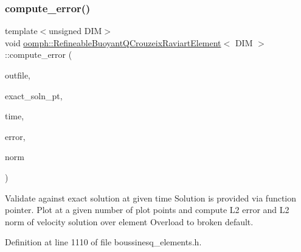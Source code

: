 \subsubsection{\texorpdfstring{compute\+\_\+error()}{compute\_error()}\hspace{0.1cm}{\footnotesize\ttfamily [1/2]}}
{\footnotesize\ttfamily template$<$unsigned D\+IM$>$ \\
void \hyperlink{classoomph_1_1RefineableBuoyantQCrouzeixRaviartElement}{oomph\+::\+Refineable\+Buoyant\+Q\+Crouzeix\+Raviart\+Element}$<$ D\+IM $>$\+::compute\+\_\+error (\begin{DoxyParamCaption}\item[{std\+::ostream \&}]{outfile,  }\item[{Finite\+Element\+::\+Unsteady\+Exact\+Solution\+Fct\+Pt}]{exact\+\_\+soln\+\_\+pt,  }\item[{const double \&}]{time,  }\item[{double \&}]{error,  }\item[{double \&}]{norm }\end{DoxyParamCaption})\hspace{0.3cm}{\ttfamily [inline]}}



Validate against exact solution at given time Solution is provided via function pointer. Plot at a given number of plot points and compute L2 error and L2 norm of velocity solution over element Overload to broken default. 



Definition at line 1110 of file boussinesq\+\_\+elements.\+h.

\mbox{\label{classoomph_1_1RefineableBuoyantQCrouzeixRaviartElement_a078039343f5f9bb467a1183f725d1873}} 
